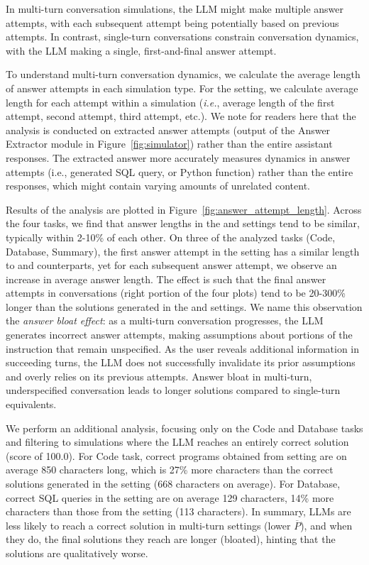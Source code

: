 \documentclass{article}
\begin{document}
\begin{appendices}
In multi-turn conversation simulations, the LLM might make multiple answer attempts, with each subsequent attempt being potentially based on previous attempts. In contrast, single-turn conversations constrain conversation dynamics, with the LLM making a single, first-and-final answer attempt.

To understand multi-turn conversation dynamics, we calculate the average length of answer attempts in each simulation type. For the \shardedt setting, we calculate average length for each attempt within a simulation (\textit{i.e.}, average length of the first attempt, second attempt, third attempt, etc.). We note for readers here that the analysis is conducted on extracted answer attempts (output of the Answer Extractor module in Figure~\ref{fig:simulator}) rather than the entire assistant responses. The extracted answer more accurately measures dynamics in answer attempts (i.e., generated SQL query, or Python function) rather than the entire responses, which might contain varying amounts of unrelated content.

Results of the analysis are plotted in Figure~\ref{fig:answer_attempt_length}. Across the four tasks, we find that answer lengths in the \fullt and \concatt settings tend to be similar, typically within 2-10\% of each other. On three of the analyzed tasks (Code, Database, Summary), the first answer attempt in the \shardedt setting has a similar length to \fullt and \concatt counterparts, yet for each subsequent answer attempt, we observe an increase in average answer length. The effect is such that the final answer attempts in \shardedt conversations (right portion of the four plots) tend to be 20-300\% longer than the solutions generated in the \fullt and \concatt settings. We name this observation the \textit{answer bloat effect}: as a multi-turn conversation progresses, the LLM generates incorrect answer attempts, making assumptions about portions of the instruction that remain unspecified. As the user reveals additional information in succeeding turns, the LLM does not successfully invalidate its prior assumptions and overly relies on its previous attempts. Answer bloat in multi-turn, underspecified conversation leads to longer solutions compared to single-turn equivalents.

We perform an additional analysis, focusing only on the Code and Database tasks and filtering to simulations where the LLM reaches an entirely correct solution (score of 100.0). For Code task, correct programs obtained from \shardedt setting are on average 850 characters long, which is 27\% more characters than the correct solutions generated in the \fullt setting (668 characters on average).
For Database, correct SQL queries in the \shardedt setting are on average 129 characters, 14\% more characters than those from the \fullt setting (113 characters).
In summary, LLMs are less likely to reach a correct solution in multi-turn settings (lower $\overline{P}$), and when they do, the final solutions they reach are longer (bloated), hinting that the solutions are qualitatively worse.


\end{appendices}
\end{document}
